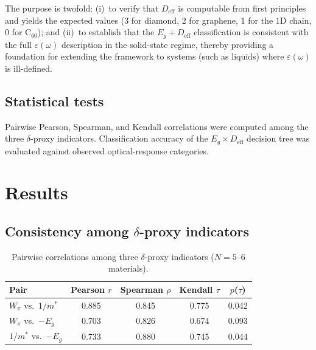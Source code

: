 \documentclass[twocolumn,showpacs,preprintnumbers,amsmath,amssymb,prb]{revtex4-2}
\begin{document}
The purpose is twofold: (i)~to verify that $D_\mathrm{eff}$ is
computable from first principles and yields the expected values
(3 for diamond, 2 for graphene, 1 for the 1D chain, 0 for C$_{60}$);
and (ii)~to establish that the $E_g + D_\mathrm{eff}$ classification
is consistent with the full $\varepsilon(\omega)$ description in the
solid-state regime, thereby providing a foundation for extending the
framework to systems (such as liquids) where $\varepsilon(\omega)$ is
ill-defined.

\subsection{Statistical tests}

Pairwise Pearson, Spearman, and Kendall correlations were computed among
the three $\delta$-proxy indicators. Classification accuracy of the
$E_g \times D_\mathrm{eff}$ decision tree was evaluated against observed
optical-response categories.

\section{Results}
\label{sec:results}

\subsection{Consistency among $\delta$-proxy indicators}

\begin{table}[h]
\caption{Pairwise correlations among three $\delta$-proxy indicators
  ($N = 5$--$6$ materials).}
\label{tab:correlations}
\begin{ruledtabular}
\begin{tabular}{lcccc}
  Pair & Pearson $r$ & Spearman $\rho$ & Kendall $\tau$ & $p$($\tau$) \\
  \hline
  $W_\pi$ vs.\ $1/m^*$ & 0.885 & 0.845 & 0.775 & 0.042 \\
  $W_\pi$ vs.\ $-E_g$ & 0.703 & 0.826 & 0.674 & 0.093 \\
  $1/m^*$ vs.\ $-E_g$ & 0.733 & 0.880 & 0.745 & 0.044 \\
\end{tabular}
\end{ruledtabular}
\end{table}
\end{document}

